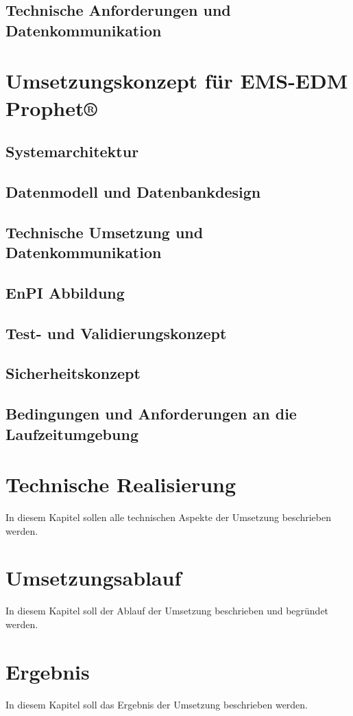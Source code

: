 \documentclass[a4paper,10pt,twoside]{report}
\begin{document}
\subsection{Technische Anforderungen und Datenkommunikation}


\section{Umsetzungskonzept für EMS-EDM Prophet®}

\subsection{Systemarchitektur}
\subsection{Datenmodell und Datenbankdesign}
\subsection{Technische Umsetzung und Datenkommunikation}
\subsection{EnPI Abbildung}
\subsection{Test- und Validierungskonzept}
\subsection{Sicherheitskonzept}
\subsection{Bedingungen und Anforderungen an die Laufzeitumgebung}

\section{Technische Realisierung}
In diesem Kapitel sollen alle technischen Aspekte der Umsetzung beschrieben werden.
\section{Umsetzungsablauf}
In diesem Kapitel soll der Ablauf der Umsetzung beschrieben und begründet werden.
\section{Ergebnis}
In diesem Kapitel soll das Ergebnis der Umsetzung beschrieben werden.
\end{document}
